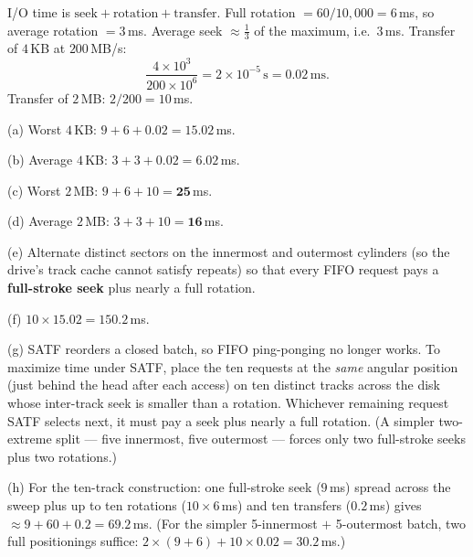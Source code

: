 \documentclass[11pt,a4paper]{article}
\newenvironment{Sol}{%
  \begin{tcolorbox}[sboxstyle, title={Solution}]%
}{%
  \end{tcolorbox}\vspace{0.35em}%
}
\begin{document}
\begin{Sol}
I/O time is $\mathrm{seek}+\mathrm{rotation}+\mathrm{transfer}$.
Full rotation $= 60/10{,}000 = 6$\,ms, so average rotation $= 3$\,ms.
Average seek $\approx \tfrac13$ of the maximum, i.e.\ $3$\,ms.
Transfer of $4$\,KB at $200$\,MB/s:
\[
\frac{4\times 10^{3}}{200\times 10^{6}} = 2\times 10^{-5}\,\mathrm{s}
= 0.02\,\mathrm{ms}.
\]
Transfer of $2$\,MB: $2/200 = 10$\,ms.

(a) Worst $4$\,KB: $9 + 6 + 0.02 = \mathbf{15.02}$\,ms.

(b) Average $4$\,KB: $3 + 3 + 0.02 = \mathbf{6.02}$\,ms.

(c) Worst $2$\,MB: $9 + 6 + 10 = \mathbf{25}$\,ms.

(d) Average $2$\,MB: $3 + 3 + 10 = \mathbf{16}$\,ms.

(e) Alternate distinct sectors on the innermost and outermost cylinders
(so the drive's track cache cannot satisfy repeats) so that every FIFO
request pays a \textbf{full-stroke seek} plus nearly a full rotation.

(f) $10\times 15.02 = \mathbf{150.2}$\,ms.

(g) SATF reorders a closed batch, so FIFO ping-ponging no longer works.
To maximize time under SATF, place the ten requests at the \emph{same}
angular position (just behind the head after each access) on ten
distinct tracks across the disk whose inter-track seek is smaller than a
rotation. Whichever remaining request SATF selects next, it must pay a
seek plus nearly a full rotation. (A simpler two-extreme split --- five
innermost, five outermost --- forces only two full-stroke seeks plus two
rotations.)

(h) For the ten-track construction: one full-stroke seek ($9$\,ms)
spread across the sweep plus up to ten rotations ($10\times 6$\,ms) and
ten transfers ($0.2$\,ms) gives $\approx 9 + 60 + 0.2 = \mathbf{69.2}$\,ms.
(For the simpler 5-innermost $+$ 5-outermost batch, two full positionings
suffice: $2\times(9+6)+10\times 0.02 = \mathbf{30.2}$\,ms.)
\end{Sol}
\end{document}
